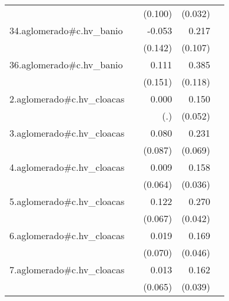 {\begin{longtable}{l*{4}{D{.}{.}{-1}}}
            &                     &     (0.100)         &     (0.032)         &                     \\
\addlinespace
34.aglomerado#c.hv\_banio&                     &      -0.053         &       0.217\sym{*}  &                     \\
            &                     &     (0.142)         &     (0.107)         &                     \\
\addlinespace
36.aglomerado#c.hv\_banio&                     &       0.111         &       0.385\sym{**} &                     \\
            &                     &     (0.151)         &     (0.118)         &                     \\
\addlinespace
2.aglomerado#c.hv\_cloacas&                     &       0.000         &       0.150\sym{**} &                     \\
            &                     &         (.)         &     (0.052)         &                     \\
\addlinespace
3.aglomerado#c.hv\_cloacas&                     &       0.080         &       0.231\sym{***}&                     \\
            &                     &     (0.087)         &     (0.069)         &                     \\
\addlinespace
4.aglomerado#c.hv\_cloacas&                     &       0.009         &       0.158\sym{***}&                     \\
            &                     &     (0.064)         &     (0.036)         &                     \\
\addlinespace
5.aglomerado#c.hv\_cloacas&                     &       0.122         &       0.270\sym{***}&                     \\
            &                     &     (0.067)         &     (0.042)         &                     \\
\addlinespace
6.aglomerado#c.hv\_cloacas&                     &       0.019         &       0.169\sym{***}&                     \\
            &                     &     (0.070)         &     (0.046)         &                     \\
\addlinespace
7.aglomerado#c.hv\_cloacas&                     &       0.013         &       0.162\sym{***}&                     \\
            &                     &     (0.065)         &     (0.039)         &                     \\

\end{longtable}}
